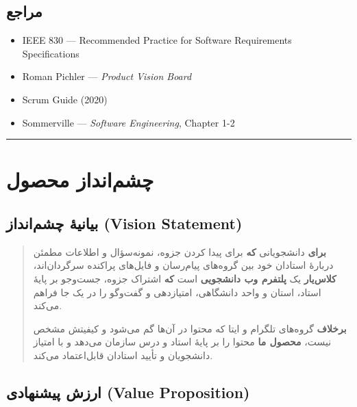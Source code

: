 \documentclass[12pt, a4paper]{article}
\begin{document}
\subsection{مراجع}

\begin{itemize}
\tightlist
\item
  IEEE 830 — Recommended Practice for Software Requirements Specifications
\item
  Roman Pichler — \emph{Product Vision Board}
\item
  Scrum Guide (2020)
\item
  Sommerville — \emph{Software Engineering}, Chapter 1-2
\end{itemize}

\begin{center}\rule{0.5\linewidth}{0.5pt}\end{center}

\section{چشم‌انداز محصول}

\subsection{بیانیهٔ چشم‌انداز (Vision Statement)}

\begin{quote}
\textbf{برای} دانشجویانی \textbf{که} برای پیدا کردن جزوه، نمونه‌سؤال و اطلاعات مطمئن
دربارهٔ استادان خود بین گروه‌های پیام‌رسان و فایل‌های پراکنده سرگردان‌اند،
\textbf{کلاس‌یار} یک \textbf{پلتفرم وب دانشجویی} است
\textbf{که} اشتراک جزوه، جست‌وجو بر پایهٔ استاد، استان و واحد دانشگاهی،
امتیازدهی و گفت‌وگو را در یک جا فراهم می‌کند.

\textbf{برخلاف} گروه‌های تلگرام و ایتا که محتوا در آن‌ها گم می‌شود و کیفیتش
مشخص نیست، \textbf{محصول ما} محتوا را بر پایهٔ استاد و درس سازمان می‌دهد و با
امتیاز دانشجویان و تأیید استادان قابل‌اعتماد می‌کند.
\end{quote}

\subsection{ارزش پیشنهادی (Value Proposition)}
\end{document}
